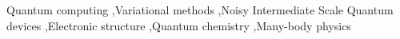 \documentclass[a4paper,fleqn]{cas-sc}
\begin{document}
\begin{keywords}
Quantum computing \sep Variational methods \sep Noisy Intermediate Scale Quantum devices \sep Electronic structure \sep Quantum chemistry \sep Many-body physics
\end{keywords}

\maketitle
\tableofcontents 









%
%
%
%
%
%
% 
% 
% 
% 
% 




\end{document}
